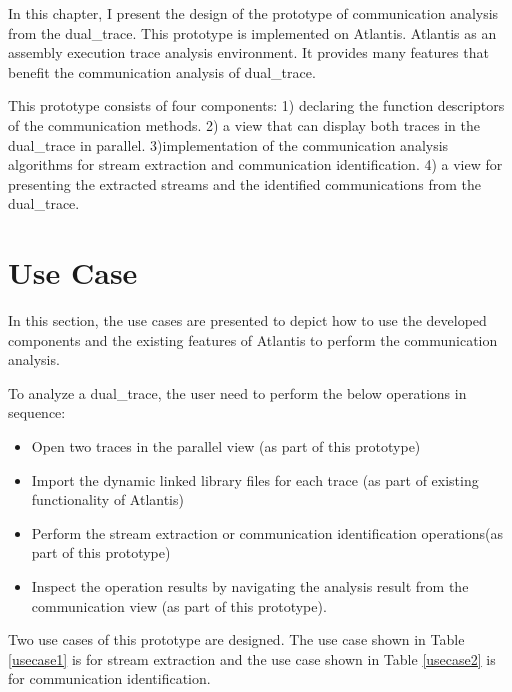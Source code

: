

\label{chapter:newsol}
In this chapter, I present the design of the prototype of communication analysis from the dual\_trace. This prototype is implemented on Atlantis. Atlantis as an assembly execution trace analysis environment. It provides many features that benefit the communication analysis of dual\_trace. 

This prototype consists of four components: 1) declaring the function descriptors of the communication methods. 2) a view that can display both traces in the dual\_trace in parallel. 3)implementation of the communication analysis algorithms for stream extraction and communication identification. 4) a view for presenting the extracted streams and the identified communications from the dual\_trace.

\section{Use Case}
In this section, the use cases are presented to depict how to use the developed components and the existing features of Atlantis to perform the communication analysis.

To analyze a dual\_trace, the user need to perform the below operations in sequence:
\begin{itemize}
\item Open two traces in the parallel view (as part of this prototype)
\item Import the dynamic linked library files for each trace (as part of existing functionality of Atlantis)
\item Perform the stream extraction or communication identification operations(as part of this prototype)
\item Inspect the operation results by navigating the analysis result from the communication view (as part of this prototype).
\end{itemize}

Two use cases of this prototype are designed. The use case shown in Table \ref{usecase1} is for stream extraction and the use case shown in Table \ref{usecase2} is for communication identification. 

